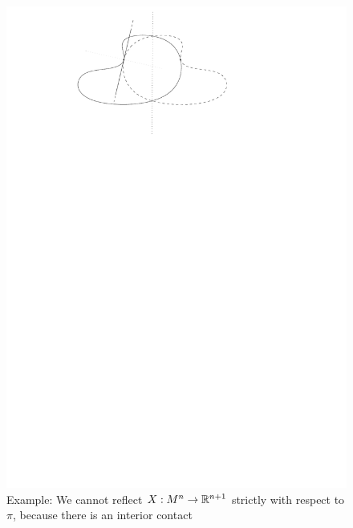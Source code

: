 \begin{figure}
	\centering
	\includegraphics[width=\textwidth]{"figures/8_interior_contact"}
	\caption{Example: We cannot reflect $X: M^n\rightarrow \mathbb{R}^{n+1}$ strictly with respect to $\pi$, because there is an interior contact}
\end{figure}
